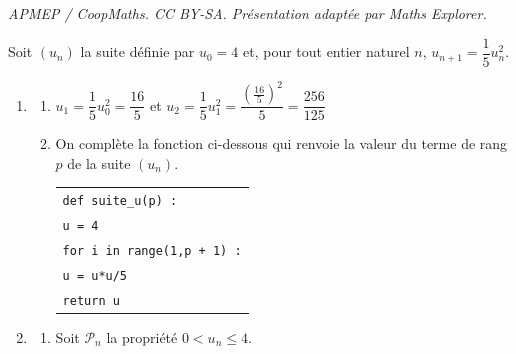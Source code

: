 \documentclass[10pt]{article}
\providecommand{\blue}{\color{blue}}
\providecommand{\blue}{\color{blue}}
\begin{document}
\noindent\textit{APMEP / CoopMaths. CC BY-SA. Présentation adaptée par Maths Explorer.}\par\medskip
\medskip

Soit $\left(u_n\right)$ la suite définie par $u_0 = 4$ et, pour tout entier naturel $n$,\: $u_{n+1} = \dfrac15 u_n^2$.



\begin{enumerate}
\item 
	\begin{enumerate}
		\item $u_1 = \dfrac{1}{5} u_0^2 = \dfrac{16}{5}$ et $u_2 = \dfrac{1}{5} u_1^{2} = \dfrac{\left (\frac{16}{5}\right )^2}{5} = \dfrac{256}{125}$
		
		\item On complète la fonction ci-dessous qui renvoie la valeur du terme de rang $p$ de la suite $\left(u_n\right)$.

\begin{center}
\begin{tabular}{l}
\texttt{def suite\_u(p) :}\\
\quad \texttt{u = \blue 4}\\
\quad \texttt{for i in range(1,{\blue p + 1}) :}\\
\quad \qquad \texttt{u = \blue u*u/5}\\
\quad \texttt{return u}\\
\end{tabular}
\end{center}
	\end{enumerate}

\item 
	\begin{enumerate}
		\item 
Soit $\mathcal{P}_n$ la propriété $0 < u_n \leqslant 4$.

\end{enumerate}
\end{enumerate}
\end{document}
